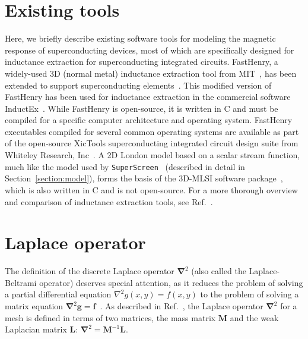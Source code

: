 \documentclass[final,3p,times]{elsarticle}
\newcommand{\inline}[1]{\texttt{#1}\xspace}
\newcommand{\SuperScreen}{\inline{SuperScreen}}
\newcounter{bla}
\begin{document}

\appendix

\section{Existing tools}
\label{appendix:other-tools}

Here, we briefly describe existing software tools for modeling the magnetic response of superconducting devices, most of which are specifically designed for inductance extraction for superconducting integrated circuits. FastHenry, a widely-used 3D (normal metal) inductance extraction tool from MIT~\cite{Kamon1994-ck}, has been extended to support superconducting elements~\cite{wrcad, XicTools}. This modified version of FastHenry has been used for inductance extraction in the commercial software InductEx~\cite{Fourie2011-wl}. While FastHenry is open-source, it is written in C and must be compiled for a specific computer architecture and operating system. FastHenry executables compiled for several common operating systems are available as part of the open-source XicTools superconducting integrated circuit design suite from Whiteley Research, Inc~\cite{wrcad, XicTools}. A 2D London model based on a scalar stream function, much like the model used by \SuperScreen~\cite{Brandt2004-ew, Brandt2005-wj} (described in detail in Section~\ref{section:model}), forms the basis of the 3D-MLSI software package~\cite{Khapaev1997-kw, Khapaev2001-xq, Khapaev2001-pw}, which is also written in C and is not open-source. For a more thorough overview and comparison of inductance extraction tools, see Ref.~\cite{Gaj1999-ls}.

\section{Laplace operator}
\label{appendix:laplace}

The definition of the discrete Laplace operator $\mathbf{\nabla}^2$ (also called the Laplace-Beltrami operator) deserves special attention, as it reduces the problem of solving a partial differential equation $\nabla^2g(x,y)=f(x,y)$ to the problem of solving a matrix equation
$\mathbf{\nabla}^2\mathbf{g}=\mathbf{f}$~\cite{Reuter2009-hr}. As described in Ref.~\cite{Crane_Vouga_2014}, the Laplace operator $\mathbf{\nabla}^2$ for a mesh is defined in terms of two matrices, the mass matrix $\mathbf{M}$ and the
weak Laplacian matrix $\mathbf{L}$: $\mathbf{\nabla}^2 = \mathbf{M}^{-1}\mathbf{L}$.
\end{document}
